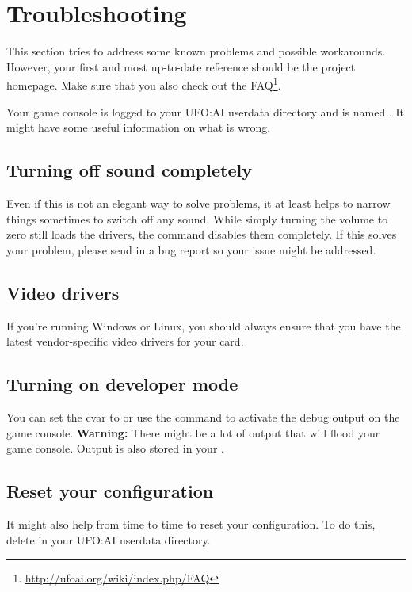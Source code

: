 \section{Troubleshooting}
This section tries to address some known problems and possible workarounds. However, your first and most up-to-date reference should be the project homepage. Make sure that you also check out the FAQ\footnote{\url{http://ufoai.org/wiki/index.php/FAQ}}.

Your game console is logged to your UFO:AI userdata directory and is named . It might have some useful information on what is wrong.

\subsection{Turning off sound completely}
Even if this is not an elegant way to solve problems, it at least helps to narrow things sometimes to switch off any sound. While simply turning the volume to zero still loads the drivers, the command   disables them completely. If this solves your problem, please send in a bug report so your issue might be addressed.

\subsection{Video drivers}
If you're running Windows or Linux, you should always ensure that you have the latest vendor-specific video drivers for your card.

\subsection{Turning on developer mode}
You can set the cvar  to  or use the  command to activate the debug output on the game console. \textbf{Warning:} There might be a lot of output that will flood your game console. Output is also stored in your .

\subsection{Reset your configuration}
It might also help from time to time to reset your configuration. To do this, delete  in your UFO:AI userdata directory.
